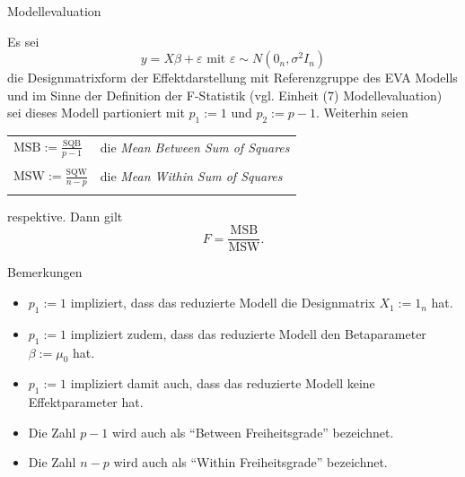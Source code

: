 \documentclass[
  8pt,
  ignorenonframetext,
]{beamer}
\providecommand{\tightlist}{%
  \setlength{\itemsep}{0pt}\setlength{\parskip}{0pt}}
\begin{document}
\begin{frame}{Modellevaluation}
\protect\hypertarget{modellevaluation-6}{}
\footnotesize
\begin{theorem}[F-Teststatistik]
\justifying
\normalfont
Es sei
\begin{equation}
y = X\beta + \varepsilon \mbox{ mit } \varepsilon \sim N(0_n,\sigma^2I_n)
\end{equation}
die Designmatrixform der Effektdarstellung mit Referenzgruppe des EVA Modells und
im Sinne der Definition der F-Statistik (vgl. Einheit (7) Modellevaluation) sei
dieses Modell partioniert mit $p_1 := 1$ und $p_2 := p - 1$. Weiterhin seien

\center
\vspace{1mm}
\begin{tabular}{ll}
$\mbox{MSB} := \frac{\mbox{SQB}}{p-1}$        & die \textit{Mean Between Sum of Squares} \\\\
$\mbox{MSW} := \frac{\mbox{SQW}}{n-p}$        & die \textit{Mean Within  Sum of Squares} \\\\
\end{tabular}

\flushleft
respektive. Dann gilt
\begin{equation}
F = \frac{\mbox{MSB}}{\mbox{MSW}}.
\end{equation}
\end{theorem}

Bemerkungen

\begin{itemize}
\tightlist
\item
  \(p_1 := 1\) impliziert, dass das reduzierte Modell die Designmatrix
  \(X_1 := 1_n\) hat.
\item
  \(p_1 := 1\) impliziert zudem, dass das reduzierte Modell den
  Betaparameter \(\beta := \mu_0\) hat.
\item
  \(p_1 := 1\) impliziert damit auch, dass das reduzierte Modell keine
  Effektparameter hat.
\item
  Die Zahl \(p-1\) wird auch als ``Between Freiheitsgrade'' bezeichnet.
\item
  Die Zahl \(n-p\) wird auch als ``Within Freiheitsgrade'' bezeichnet.
\end{itemize}
\end{frame}
\end{document}
